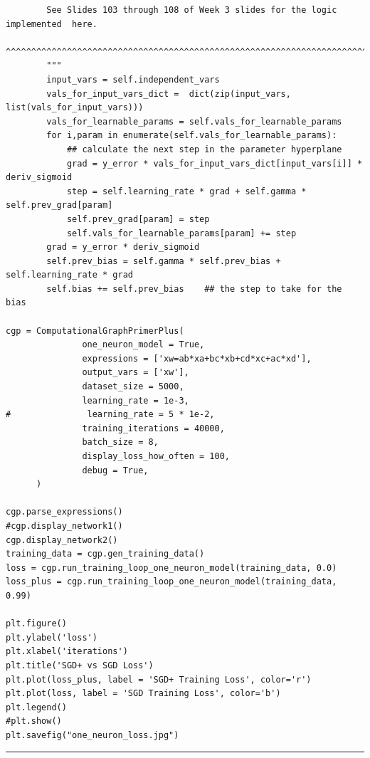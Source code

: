 \documentclass{article}
\begin{document}
\begin{verbatim}
        See Slides 103 through 108 of Week 3 slides for the logic implemented  here.
        ^^^^^^^^^^^^^^^^^^^^^^^^^^^^^^^^^^^^^^^^^^^^^^^^^^^^^^^^^^^^^^^^^^^^^^^^^^^^
        """
        input_vars = self.independent_vars
        vals_for_input_vars_dict =  dict(zip(input_vars, list(vals_for_input_vars)))
        vals_for_learnable_params = self.vals_for_learnable_params
        for i,param in enumerate(self.vals_for_learnable_params):
            ## calculate the next step in the parameter hyperplane
            grad = y_error * vals_for_input_vars_dict[input_vars[i]] * deriv_sigmoid
            step = self.learning_rate * grad + self.gamma * self.prev_grad[param]
            self.prev_grad[param] = step
            self.vals_for_learnable_params[param] += step
        grad = y_error * deriv_sigmoid
        self.prev_bias = self.gamma * self.prev_bias + self.learning_rate * grad
        self.bias += self.prev_bias    ## the step to take for the bias

cgp = ComputationalGraphPrimerPlus(
               one_neuron_model = True,
               expressions = ['xw=ab*xa+bc*xb+cd*xc+ac*xd'],
               output_vars = ['xw'],
               dataset_size = 5000,
               learning_rate = 1e-3,
#               learning_rate = 5 * 1e-2,
               training_iterations = 40000,
               batch_size = 8,
               display_loss_how_often = 100,
               debug = True,
      )

cgp.parse_expressions()
#cgp.display_network1()
cgp.display_network2()
training_data = cgp.gen_training_data()
loss = cgp.run_training_loop_one_neuron_model(training_data, 0.0)
loss_plus = cgp.run_training_loop_one_neuron_model(training_data, 0.99)

plt.figure()
plt.ylabel('loss')
plt.xlabel('iterations')
plt.title('SGD+ vs SGD Loss')
plt.plot(loss_plus, label = 'SGD+ Training Loss', color='r')
plt.plot(loss, label = 'SGD Training Loss', color='b')
plt.legend()
#plt.show()
plt.savefig("one_neuron_loss.jpg")

\end{verbatim}
\vspace{-0.45in}
\textcolor{red}{\rule[-0.3in]{6.1in}{0.03in}}\\
\end{document}
